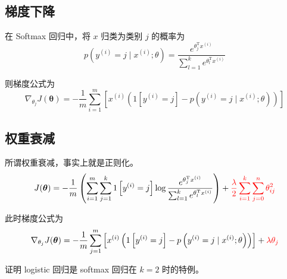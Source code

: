 \subsection{梯度下降}
在 Softmax 回归中，将 $x$ 归类为类别 $j$ 的概率为
\begin{equation}
    p\left(y^{(i)}=j \mid x^{(i)} ; \theta\right)
    =\frac{e^{\theta_{j}^{\mathrm T} x^{(i)}}}{\sum_{l=1}^{k} e^{\theta_{l}^{\mathrm T} x^{(i)}}}
\end{equation}

则梯度公式为
\begin{equation}
    \nabla_{\theta_{j}} J(\boldsymbol\theta)=-\frac{1}{m} 
    \sum_{i=1}^{m}\left[x^{(i)}\left(1\left[y^{(i)}=j\right]-p\left(y^{(i)}=j \mid x^{(i)} ; \theta\right)\right)\right]
\end{equation}

\subsection{权重衰减}
所谓权重衰减，事实上就是正则化。
\begin{equation}
    J(\boldsymbol{\theta}) = -\dfrac 1m \left(\sum_{i=1}^m\sum_{j=1}^k1\left[y^{(i)} = j\right]\log \dfrac{e^{\theta_j^\mathrm Tx^{(i)}}}{\sum_{l=1}^k 
    e^{\theta_l^\mathrm Tx^{(i)}}}\right) + \textcolor{red}{\dfrac \lambda 2\sum_{i=1}^k\sum_{j=0}^n\theta_{ij}^2}
\end{equation}

此时梯度公式为
\begin{equation}
    \nabla_{\theta_{j}} J(\boldsymbol\theta)=-\frac{1}{m} \sum_{j=1}^{m}
    \left[x^{(i)}\left(1\left[y^{(i)}=j\right]-p\left(y^{(i)}=j \mid x^{(i)} ; \theta\right)\right)\right] 
    + \textcolor{red}{\lambda \theta_j}
\end{equation}

\begin{example}
    证明 logistic 回归是 softmax 回归在 $k = 2$ 时的特例。
\end{example}

